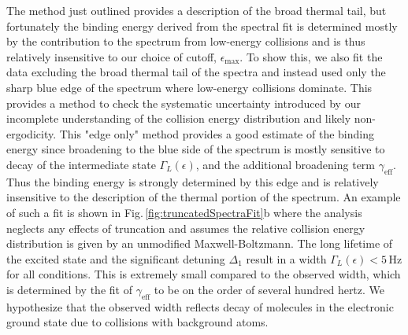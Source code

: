 The method just outlined provides a description of the broad thermal tail, but fortunately the binding energy derived from the spectral fit is determined mostly by the contribution to the spectrum from low-energy collisions and is thus relatively insensitive to our choice of cutoff, $\epsilon_{\text{max}}$. 
To show this, we also fit the data excluding the broad thermal tail of the spectra and instead used only the sharp blue edge of the spectrum where low-energy collisions dominate.
This provides a method to check the systematic uncertainty introduced by our incomplete understanding of the collision energy distribution and likely non-ergodicity. 
This "edge only" method provides a good estimate of the binding energy since broadening to the blue side of the spectrum is mostly sensitive to decay of the intermediate state $\Gamma_L(\epsilon)$, and the additional broadening term $\gamma_{\text{eff}}$.
Thus the binding energy is strongly determined by this edge and is relatively insensitive to the description of the thermal portion of the spectrum.
An example of such a fit is shown in Fig.\,\ref{fig:truncatedSpectraFit}b where the analysis neglects any effects of truncation and assumes the relative collision energy distribution is given by an unmodified Maxwell-Boltzmann.
The long lifetime of the excited state and the significant detuning $\Delta_1$ result in a width $\Gamma_L(\epsilon) < 5\,\text{Hz}$ for all conditions.
This is extremely small compared to the observed width, which is determined by the fit of $\gamma_{\text{eff}}$ to be on the order of several hundred hertz.
We hypothesize that the observed width reflects decay of molecules in the electronic ground state due to collisions with background atoms.

